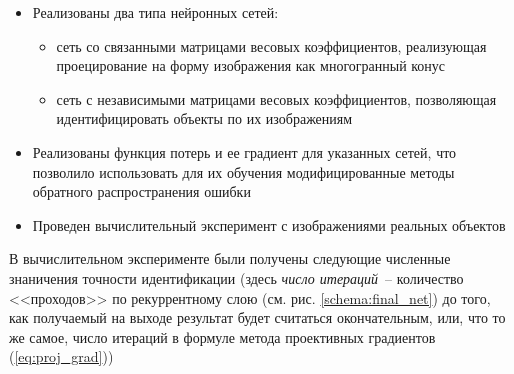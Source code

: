 \documentclass[a4paper, 12pt]{article}
\begin{document}
\begin{itemize}
\item Реализованы два типа нейронных сетей:
	\begin{itemize}
	\item[--] сеть со связанными матрицами весовых коэффициентов, реализующая проецирование на форму изображения как многогранный конус
	\item[--] сеть с независимыми матрицами весовых коэффициентов, позволяющая идентифицировать объекты по их изображениям
	\end{itemize}
\item Реализованы функция потерь и ее градиент для указанных сетей, что позволило использовать для их обучения модифицированные методы обратного распространения ошибки
\item Проведен вычислительный эксперимент с изображениями реальных объектов
\end{itemize}

В вычислительном эксперименте были получены следующие численные знаничения точности идентификации (здесь \emph{число итераций}~-- количество <<проходов>> по рекуррентному слою (см. рис. \ref{schema:final_net}) до того, как получаемый на выходе результат будет считаться окончательным, или, что то же самое, число итераций в формуле метода проективных градиентов (\ref{eq:proj_grad}))\\
\end{document}
